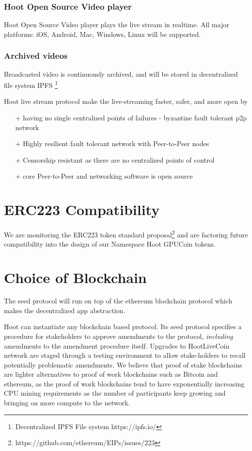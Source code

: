 \documentclass{article}
\begin{document}
\subsubsection{Hoot Open Source Video player}
Hoot Open Source Video player plays the live stream in realtime. All major platforms: iOS, Android, Mac, Windows, Linux will be supported.

\subsubsection{Archived videos}
Broadcasted video is continuously archived, and will be stored in decentralized file system IPFS \footnote{Decentralized IPFS File system https://ipfs.io/}

Hoot live stream protocol make the live-streaming faster, safer, and more open by

\begin{itemize}
 \item[+]having no single centralized points of failures - byzantine fault tolerant p2p network
 \item[+]Highly resilient fault tolerant network with Peer-to-Peer nodes
 \item[+]Censorship resistant as there are no centralized points of control
 \item[+]core Peer-to-Peer and networking software is open source
\end{itemize}

\section{ERC223 Compatibility}
We are monitoring the ERC223 token standard proposal\footnote{https://github.com/ethereum/EIPs/issues/223} and are factoring future compatibility into the design of our Namespace Hoot GPUCoin tokens.

\section{Choice of Blockchain}
The seed protocol will run on top of the ethereum blockchain protocol which makes the decentralized app abstraction. 

Hoot can instantiate any blockchain based protocol. Its seed protocol specifies a procedure for stakeholders to approve amendments to the protocol, \emph{including} amendments to the amendment procedure itself. Upgrades to HootLiveCoin network are staged through a testing environment to allow stake-holders to recall potentially problematic amendments. We believe that proof of stake blockchains are lighter alternatives to proof of work blockchains such as Bitcoin and ethereum, as the proof of work blockchains tend to have exponentially increasing CPU mining requirements as the number of participants keep growing and bringing on more compute to the network.
\end{document}

